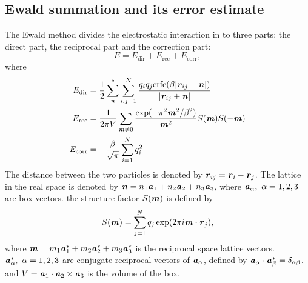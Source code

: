 \documentclass[aps,pre,preprint,unsortedaddress]{revtex4}
\renewcommand{\v}[1]{\textbf{\textit{#1}}}
\begin{document}
\subsection{Ewald summation and its error estimate}
The Ewald method divides the electrostatic interaction in to three
parts: the direct part, the reciprocal part and the correction
part:
\begin{equation}
E = E_{\textrm{dir}} + E_{\textrm{rec}} + E_{\textrm{corr}},
\end{equation}
where 
\begin {align}\label{eqn:tmp2}
E_{\textrm{dir}} & = \frac12 \sum^{\ast}_{\v n}
\sum_{i,j = 1}^{N} \frac{q_iq_j \textrm{erfc}(\beta \vert\v{r}_{ij} + \v{n}\vert)}
{\vert\v{r}_{ij} + \v{n}\vert} \\\label{eqn:tmp3}
E_{\textrm{rec}} & = \frac1{2\pi V} \sum_{\v m \neq 0}
\frac{\exp(-\pi^2\v m^2 / \beta^2)}{\v m^2} S(\v m) S(-\v m) \\\label{eqn:tmp4}
 E_{\textrm{corr}}& = -\frac\beta{\sqrt \pi} \sum_{i=1}^N q_i^2
\end {align}
The distance between the two particles is denoted by $\v r_{ij} = \v
r_i - \v r_j$.  The lattice in the real space is denoted
by $\v n = n_1 \v a_1 + n_2 \v a_2 + n_3 \v a_3$, where $\v a_\alpha,
\ \alpha=1,2,3$ are box vectors. the structure factor $S(\v m)$ is
defined by
\begin{equation}\label{sm1}
S(\v m) = \sum_{j=1}^N q_j \exp (2 \pi i \v m \cdot \v r_j),
\end{equation}
where $\v m = m_1 \v a_1^\ast + m_2 \v a_2^\ast + m_3 \v a_3^\ast$ is
the reciprocal space lattice vectors. $\v a_\alpha^\ast,\ \alpha = 1,
2, 3$ are conjugate reciprocal vectors of $\v a_\alpha$, defined by
$\v a_\alpha \cdot \v a_\beta^\ast = \delta_{\alpha\beta}$. and $V =
\v a_1 \cdot \v a_2 \times \v a_3$ is the volume of the box.
\end{document}
